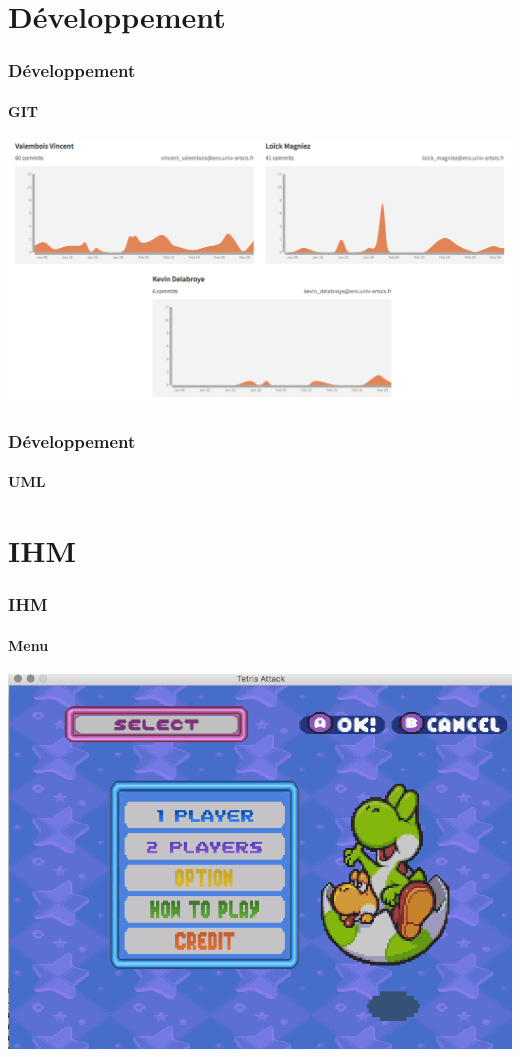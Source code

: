 \documentclass{beamer}
\begin{document}
\begin{darkframes}
 \section{Développement}
 \begin{frame}
 	 \frametitle{Développement}
 	 \begin{center}
 	 \framesubtitle{GIT}
		\includegraphics[scale=0.40]{./Image/git.png}
		\end{center}
    \end{frame}
    
     \begin{frame}
 	 \frametitle{Développement}
 	 \begin{center}
 	 \framesubtitle{UML}
		
		\end{center}
    \end{frame}
  
   \section{IHM}
 \begin{frame}
 	 \frametitle{IHM}
 	 \begin{center}
 	 \framesubtitle{Menu}
		\includegraphics[scale=0.40]{./Image/menu.png}
		\end{center}
    \end{frame}
    

\end{darkframes}
\end{document}
